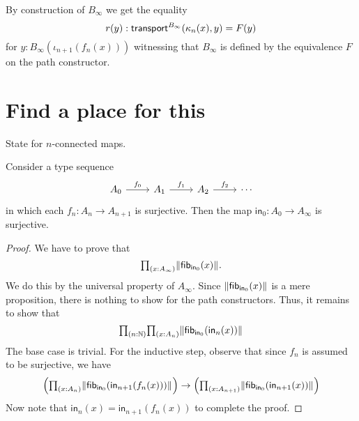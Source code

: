 By construction of $B_\infty$ we get the equality
$$r(y):\mathsf{transport}^{B_\infty}(\kappa_n(x),y)=F(y)$$
for $y:B_\infty(\iota_{n+1}(f_n(x)))$ witnessing that $B_\infty$ is defined by the equivalence $F$ on the path constructor.


\section{Find a place for this}

State for $n$-connected maps.
\begin{lem}
Consider a type sequence
\begin{equation*}
\begin{tikzcd}
A_0 \arrow[r,"f_0"] & A_1 \arrow[r,"f_1"] & A_2 \arrow[r,"f_2"] & \cdots
\end{tikzcd}
\end{equation*}
in which each $f_n:A_n\to A_{n+1}$ is surjective. Then the map $\mathsf{in}_0:A_0\to A_\infty$ is surjective.
\end{lem}

\begin{proof}
We have to prove that
\begin{equation*}
\prd{x:A_\infty} \brck{\fib{\mathsf{in}_0}{x}}.
\end{equation*}
We do this by the universal property of $A_\infty$. Since $\Vert \mathsf{fib}_{\mathsf{in}_0}(x)\Vert_{}$ is a mere proposition, there is nothing to show for the path constructors. Thus, it remains to show that
\begin{equation*}
\prd{n:\N}{x:A_n} \brck{\fib{\mathsf{in}_0}{\mathsf{in}_n(x)}}
\end{equation*}
The base case is trivial. For the inductive step, observe that since $f_n$ is assumed to be surjective, we have
\begin{equation*}
\Big(\prd{x:A_{n}} \brck{\fib{\mathsf{in}_0}{\mathsf{in}_{n+1}(f_n(x))}}\Big)\to\Big(\prd{x:A_{n+1}} \brck{\fib{\mathsf{in}_0}{\mathsf{in}_{n+1}(x)}}\Big)
\end{equation*}
Now note that $\mathsf{in}_{n}(x)=\mathsf{in}_{n+1}(f_n(x))$ to complete the proof.
\end{proof}
